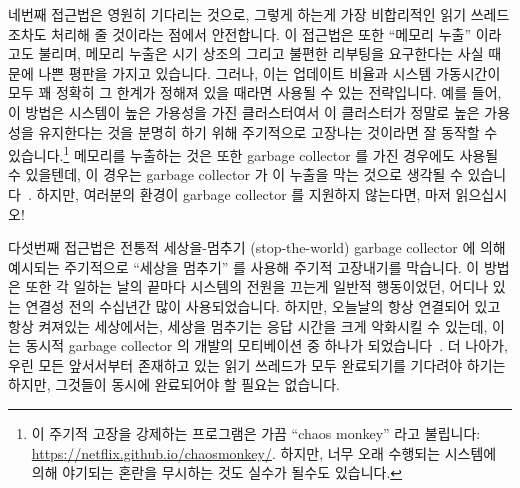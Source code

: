 \fi

네번째 접근법은 영원히 기다리는 것으로, 그렇게 하는게 가장 비합리적인 읽기
쓰레드조차도 처리해 줄 것이라는 점에서 안전합니다.
이 접근법은 또한 ``메모리 누출'' 이라고도 불리며, 메모리 누출은 시기 상조의
그리고 불편한 리부팅을 요구한다는 사실 때문에 나쁜 평판을 가지고 있습니다.
그러나, 이는 업데이트 비율과 시스템 가동시간이 모두 꽤 정확히 그 한계가 정해져
있을 때라면 사용될 수 있는 전략입니다.
예를 들어, 이 방법은 시스템이 높은 가용성을 가진 클러스터여서 이 클러스터가
정말로 높은 가용성을 유지한다는 것을 분명히 하기 위해 주기적으로 고장나는
것이라면 잘 동작할 수 있습니다.\footnote{
	이 주기적 고장을 강제하는 프로그램은 가끔 ``chaos monkey'' 라고
	불립니다:
	\url{https://netflix.github.io/chaosmonkey/}.
	하지만, 너무 오래 수행되는 시스템에 의해 야기되는 혼란을 무시하는 것도
	실수가 될수도 있습니다.}
메모리를 누출하는 것은 또한 garbage collector 를 가진 경우에도 사용될 수
있을텐데, 이 경우는 garbage collector 가 이 누출을 막는 것으로 생각될 수
있습니다~\cite{Kung80}.
하지만, 여러분의 환경이 garbage collector 를 지원하지 않는다면, 마저
읽으십시오!

다섯번째 접근법은 전통적 세상을-멈추기 (stop-the-world) garbage collector 에
의해 예시되는 주기적으로 ``세상을 멈추기'' 를 사용해 주기적 고장내기를
막습니다.
이 방법은 또한 각 일하는 날의 끝마다 시스템의 전원을 끄는게 일반적 행동이었던,
어디나 있는 연결성 전의 수십년간 많이 사용되었습니다.
하지만, 오늘날의 항상 연결되어 있고 항상 켜져있는 세상에서는, 세상을 멈추기는
응답 시간을 크게 악화시킬 수 있는데, 이는 동시적 garbage collector 의 개발의
모티베이션 중 하나가 되었습니다~\cite{DavidFBacon2003RTGC}.
더 나아가, 우린 모든 앞서서부터 존재하고 있는 읽기 쓰레드가 모두 완료되기를
기다려야 하기는 하지만, 그것들이 동시에 완료되어야 할 필요는 없습니다.

